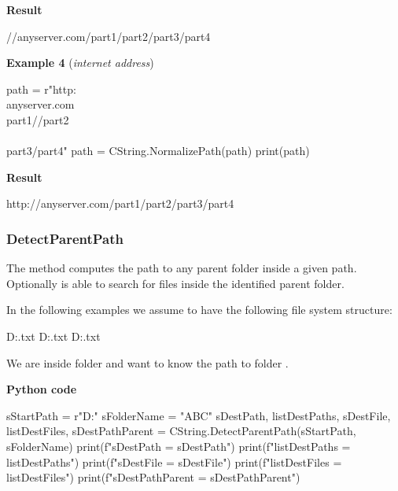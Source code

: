 \textbf{Result}

\begin{pythonlog}
//anyserver.com/part1/part2/part3/part4
\end{pythonlog}

\vspace{1ex}

\textbf{Example 4} (\textit{internet address})

\begin{pythoncode}
path = r"http:\\anyserver.com\\part1//part2\\\\part3/part4"
path = CString.NormalizePath(path)
print(path)
\end{pythoncode}

\textbf{Result}

\begin{pythonlog}
http://anyserver.com/part1/part2/part3/part4
\end{pythonlog}

\newpage

\subsubsection{DetectParentPath}

The method  computes the path to any parent folder inside a given path. Optionally  is able
to search for files inside the identified parent folder.

In the following examples we assume to have the following file system structure:

\begin{pythonlog}
D:\pathtest\ABC\DEF\GHI\FILE.txt
D:\pathtest\ABC\FILE.txt
D:\pathtest\RST\UVW\XYZ\FILE.txt
\end{pythonlog}

We are inside folder  and want to know the path to folder .

\textbf{Python code}

\begin{pythoncode}
sStartPath  = r"D:\pathtest\ABC\DEF\GHI"
sFolderName = "ABC"
sDestPath, listDestPaths, sDestFile, listDestFiles, sDestPathParent = CString.DetectParentPath(sStartPath, sFolderName)
print(f"sDestPath       = {sDestPath}")
print(f"listDestPaths   = {listDestPaths}")
print(f"sDestFile       = {sDestFile}")
print(f"listDestFiles   = {listDestFiles}")
print(f"sDestPathParent = {sDestPathParent}")
\end{pythoncode}

